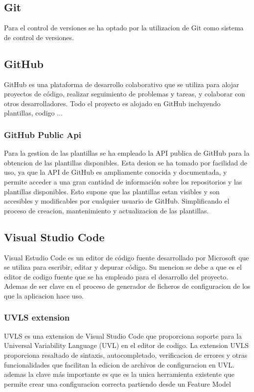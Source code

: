 \documentclass[12pt, a4paper, twoside]{article}
\begin{document}
\subsection{Git}
\cite{git}
Para el control de versiones se ha optado por la utilizacion de Git como sistema de control de versiones.
\subsection{GitHub}
\cite{github}
GitHub es una plataforma de desarrollo colaborativo que se utiliza para alojar proyectos de código, realizar seguimiento de problemas y tareas, y colaborar con otros desarrolladores.
Todo el proyecto es alojado en GitHub incluyendo plantillas, codigo ...
\subsubsection{GitHub Public Api}
\cite{github_rest_api}
Para la gestion de las plantillas se ha empleado la API publica de GitHub para la obtencion de las plantillas disponibles.
Esta desion se ha tomado por facilidad de uso, ya que la API de GitHub es ampliamente conocida y documentada, y permite acceder a una gran cantidad de información sobre los repositorios y las plantillas disponibles.
Esto supone que las plantillas estan visibles y son accesibles y modificables por cualquier usuario de GitHub.
Simplificando el proceso de creacion, mantenimiento y actualizacion de las plantillas. 
\blindtext

\subsection{Visual Studio Code}
\cite{vscode}
Visual Estudio Code es un editor de código fuente desarrollado por Microsoft que se utiliza para escribir, editar y depurar código.
Su mencion se debe a que es el editor de codigo fuente que se ha empleado para el desarrollo del proyecto. Ademas de ser clave en el proceso de generador de ficheros de configuracion
de los que la aplicacion hace uso.
\subsubsection{UVLS extension}
\cite{uvls_code}
UVLS es una extension de Visual Studio Code que proporciona soporte para la Universal Variability Language (UVL) en el editor de codigo.
La extension UVLS proporciona resaltado de sintaxis, autocompletado, verificacion de errores y otras funcionalidades que facilitan la edicion de archivos de configuracion en UVL.
ademas la clave más importante es que es la unica herramienta existente que permite crear una configuracion correcta partiendo desde un Feature Model
\end{document}
